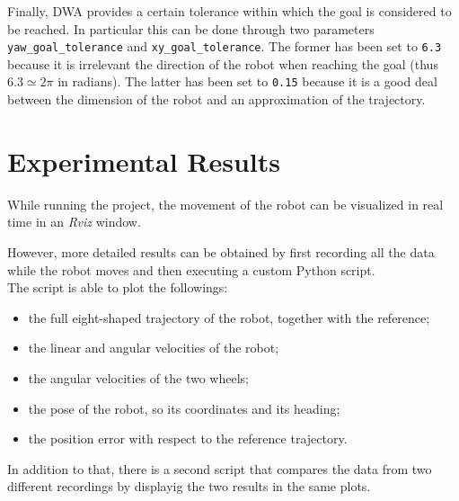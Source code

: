\documentclass[11pt,a4paper]{article}
\begin{document}
Finally, DWA provides a certain tolerance within which the goal is considered to be reached.
In particular this can be done through two parameters \texttt{yaw\_goal\_tolerance} and \texttt{xy\_goal\_tolerance}.
The former has been set to \texttt{6.3} because it is irrelevant the direction of the robot when reaching the goal
(thus $6.3 \simeq 2\pi$ in radians).
The latter has been set to \texttt{0.15} because it is a good deal between the dimension of the robot and
an approximation of the trajectory.





\section{Experimental Results}

While running the project, the movement of the robot can be visualized in real time in an \textit{Rviz} window.

However, more detailed results can be obtained by first recording all the data while the robot moves
and then executing a custom Python script.\\

The script is able to plot the followings:
\begin{itemize}
    \item the full eight-shaped trajectory of the robot, together with the reference;
    \item the linear and angular velocities of the robot;
    \item the angular velocities of the two wheels;
    \item the pose of the robot, so its coordinates and its heading;
    \item the position error with respect to the reference trajectory.\\
\end{itemize}

In addition to that, there is a second script that compares the data from two different recordings
by displayig the two results in the same plots.

\newpage


\end{document}
